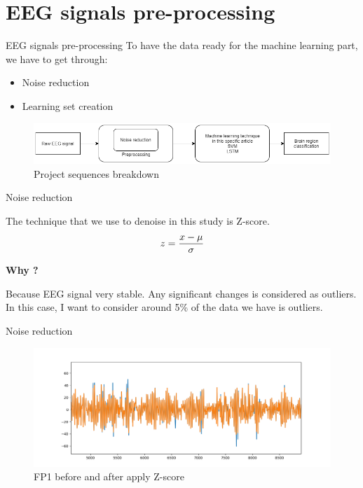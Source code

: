 \documentclass[xcolor=dvipsnames]{beamer} %
\begin{document}
	\section{EEG signals pre-processing}
	
	\begin{frame}{EEG signals pre-processing}
		To have the data ready for the machine learning part, we have to get through:
		\begin{itemize}
		    \item Noise reduction
		    \item Learning set creation
		\end{itemize}
		
		\begin{figure}
	        \centering
	        \includegraphics[scale = 0.4]{images/GeneralDiagram.png}
	        \caption{Project sequences breakdown}
	        \label{fig:breakdown}
	    \end{figure}
	\end{frame}
	
	
	\begin{frame}{Noise reduction}
	
	The technique that we use to denoise in this study is Z-score.
		$$z={{x-\mu}  \over \sigma }$$
		
	\textbf{Why ?}
	
	Because EEG signal very stable. Any significant changes is considered as outliers. In this case, I want to consider around 5\% of the data we have is outliers.
	\end{frame}
	
	\begin{frame}{Noise reduction}
	    \begin{figure}
	        \centering
	        \includegraphics[scale=0.4]{images/fp1-2.png}
	        \caption{FP1 before and after apply Z-score}
	        \label{fig:FP1}
	    \end{figure}
	\end{frame}
	
\end{document}
